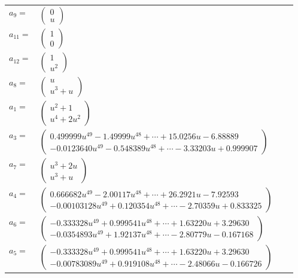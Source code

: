 \documentclass[1p]{elsarticle_modified}
\theoremstyle{definition}
\begin{document}
\begin{tabular}{m{7pt} m{180pt} m{7pt} m{180pt} }
\flushright $a_{9}=$&$\begin{pmatrix}0\\u\end{pmatrix}$ \\
\flushright $a_{11}=$&$\begin{pmatrix}1\\0\end{pmatrix}$ \\
\flushright $a_{12}=$&$\begin{pmatrix}1\\u^2\end{pmatrix}$ \\
\flushright $a_{8}=$&$\begin{pmatrix}u\\u^3+u\end{pmatrix}$ \\
\flushright $a_{1}=$&$\begin{pmatrix}u^2+1\\u^4+2 u^2\end{pmatrix}$ \\
\flushright $a_{3}=$&$\begin{pmatrix}0.499999 u^{49}-1.49999 u^{48}+\cdots+15.0256 u-6.88889\\-0.0123640 u^{49}-0.548389 u^{48}+\cdots-3.33203 u+0.999907\end{pmatrix}$ \\
\flushright $a_{7}=$&$\begin{pmatrix}u^3+2 u\\u^3+u\end{pmatrix}$ \\
\flushright $a_{4}=$&$\begin{pmatrix}0.666682 u^{49}-2.00117 u^{48}+\cdots+26.2921 u-7.92593\\-0.00103128 u^{49}+0.120354 u^{48}+\cdots-2.70359 u+0.833325\end{pmatrix}$ \\
\flushright $a_{6}=$&$\begin{pmatrix}-0.333328 u^{49}+0.999541 u^{48}+\cdots+1.63220 u+3.29630\\-0.0354893 u^{49}+1.92137 u^{48}+\cdots-2.80779 u-0.167168\end{pmatrix}$ \\
\flushright $a_{5}=$&$\begin{pmatrix}-0.333328 u^{49}+0.999541 u^{48}+\cdots+1.63220 u+3.29630\\-0.00783089 u^{49}+0.919108 u^{48}+\cdots-2.48066 u-0.166726\end{pmatrix}$ \\

\end{tabular}
\end{document}

